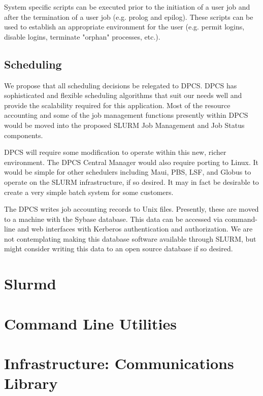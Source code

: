 System specific scripts can be executed prior to the initiation of a user job
and after the termination of a user job (e.g. prolog and epilog). These scripts
can be used to establish an appropriate environment for the user (e.g. permit
logins, disable logins, terminate "orphan" processes, etc.). 

\subsection{Scheduling}

We propose that all scheduling decisions be relegated to DPCS. DPCS has
sophisticated and flexible scheduling algorithms that suit our needs well and
provide the scalability required for this application. Most of the resource
accounting and some of the job management functions presently within DPCS would
be moved into the proposed SLURM Job Management and Job Status components. 

DPCS will require some modification to operate within this new, richer
environment. The DPCS Central Manager would also require porting to Linux. It
would be simple for other schedulers including Maui, PBS, LSF, and Globus 
to operate on the SLURM infrastructure, if so desired. It may in fact be 
desirable to create a very simple batch system for some customers.

The DPCS writes job accounting records to Unix files. Presently, these are
moved to a machine with the Sybase database. This data can be accessed via
command-line and web interfaces with Kerberos authentication and authorization.
We are not contemplating making this database software available through SLURM,
but might consider writing this data to an open source database if so desired.

\section{Slurmd}

\section{Command Line Utilities}

\section{Infrastructure: Communications Library}

